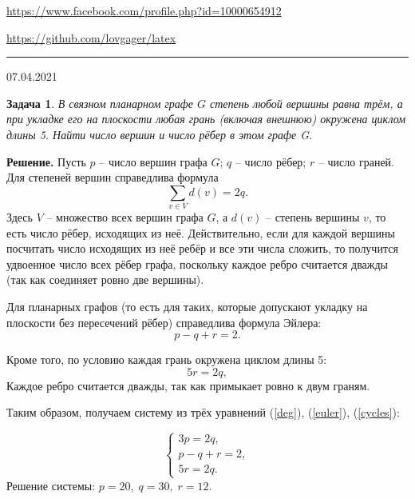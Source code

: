 \documentclass[12pt]{article}
\begin{document}


\begin{flushleft}
\url{https://www.facebook.com/profile.php?id=10000654912}

\url{https://github.com/lovgager/latex}
\end{flushleft}
\hrule 
\begin{flushright}
07.04.2021
\end{flushright}
\bigskip


\newtheorem*{task}{Задача}
\begin{task}
В связном планарном графе $G$ степень любой вершины равна трём, а при укладке его на плоскости любая грань (включая внешнюю) окружена циклом длины 5. Найти число вершин и число рёбер в этом графе G.
\end{task}

\noindent\textbf{Решение.} 
Пусть $p$ -- число вершин графа $G$;  $q$ -- число рёбер; $r$ -- число граней. Для степеней вершин справедлива формула
\begin{equation}\label{deg}
    \sum\limits_{v\in V} d(v) = 2q.
\end{equation}
Здесь $V$ -- множество всех вершин графа $G$, а $d(v)$ -- степень вершины $v$, то есть число рёбер, исходящих из неё. Действительно, если для каждой вершины посчитать число исходящих из неё ребёр и все эти числа сложить, то получится удвоенное число всех рёбер графа, поскольку каждое ребро считается дважды (так как соединяет ровно две вершины).

Для планарных графов (то есть для таких, которые допускают укладку на плоскости без пересечений рёбер) справедлива формула Эйлера:
\begin{equation}\label{euler}
    p - q + r = 2.
\end{equation}

Кроме того, по условию каждая грань окружена циклом длины 5:
\begin{equation}\label{cycles}
    5r = 2q,
\end{equation}
Каждое ребро считается дважды, так как примыкает ровно к двум граням. 

Таким образом, получаем систему из трёх уравнений (\ref{deg}), (\ref{euler}), (\ref{cycles}):

\begin{equation*}
    \begin{cases}
    3p = 2q,\\
    p-q+r = 2,\\
    5r=2q.
    \end{cases}
\end{equation*}
Решение системы: $p=20,\;q=30,\;r=12.$
\end{document}
